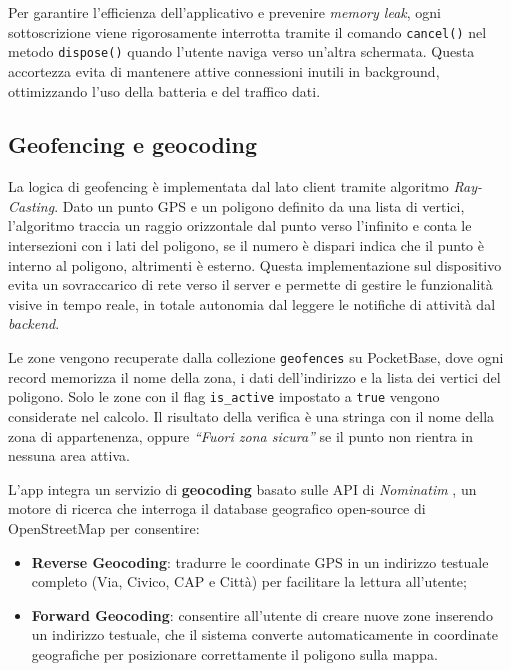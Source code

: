 \documentclass[12pt,a4paper]{article}
\begin{document}
Per garantire l'efficienza dell'applicativo e prevenire \textit{memory leak}, 
ogni sottoscrizione viene rigorosamente interrotta tramite il comando
\texttt{cancel()} nel metodo \texttt{dispose()} quando l'utente naviga verso un'altra schermata. 
Questa accortezza evita di mantenere attive connessioni inutili in background, 
ottimizzando l'uso della batteria e del traffico dati.

\subsection{Geofencing e geocoding}

La logica di geofencing è implementata dal lato client tramite algoritmo \mbox{\textit{Ray-Casting}}. 
Dato un punto GPS e un poligono definito da una lista di vertici, l'algoritmo traccia un raggio orizzontale dal punto
verso l'infinito e conta le intersezioni con i lati del poligono, se il numero è dispari
indica che il punto è interno al poligono, altrimenti è esterno. 
Questa implementazione sul dispositivo evita un sovraccarico di rete verso il server 
e permette di gestire le funzionalità visive in tempo reale, in totale autonomia dal leggere le notifiche di attività dal \textit{backend}.

Le zone vengono recuperate dalla collezione \texttt{geofences} su PocketBase, dove
ogni record memorizza il nome della zona, i dati dell'indirizzo e la lista dei vertici
del poligono. Solo le zone con il flag \texttt{is\_active} impostato a \texttt{true}
vengono considerate nel calcolo. Il risultato della verifica è una stringa con il nome
della zona di appartenenza, oppure \textit{``Fuori zona sicura''} se il punto non
rientra in nessuna area attiva. 

L'app integra un servizio di \textbf{geocoding} 
basato sulle API di \textit{Nominatim} \cite{nominatim},
un motore di ricerca che interroga il database geografico 
open-source di OpenStreetMap per consentire:
\begin{itemize}
  \item \textbf{Reverse Geocoding}: tradurre le coordinate GPS in un indirizzo testuale completo 
  (Via, Civico, CAP e Città) per facilitare la lettura all'utente;
  \item \textbf{Forward Geocoding}: consentire all'utente di creare nuove zone inserendo 
  un indirizzo testuale, che il sistema converte automaticamente in coordinate geografiche 
  per posizionare correttamente il poligono sulla mappa.
\end{itemize}
\end{document}
